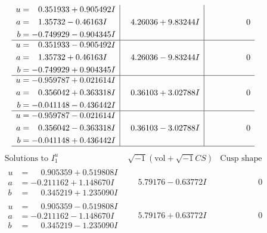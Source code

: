 \documentclass[1p]{elsarticle_modified}
\theoremstyle{definition}
\newcommand{\I}{\sqrt{-1}}
\begin{document}
$$\begin{array}{c|c|c}
\begin{aligned}
u &= \phantom{-}0.351933 + 0.905492 I \\
a &= \phantom{-}1.35732 - 0.46163 I \\
b &= -0.749929 - 0.904345 I\end{aligned}
 & \phantom{-}4.26036 + 9.83244 I & \phantom{-0.000000 } 0 \\ \hline\begin{aligned}
u &= \phantom{-}0.351933 - 0.905492 I \\
a &= \phantom{-}1.35732 + 0.46163 I \\
b &= -0.749929 + 0.904345 I\end{aligned}
 & \phantom{-}4.26036 - 9.83244 I & \phantom{-0.000000 } 0 \\ \hline\begin{aligned}
u &= -0.959787 + 0.021614 I \\
a &= \phantom{-}0.356042 + 0.363318 I \\
b &= -0.041148 - 0.436442 I\end{aligned}
 & \phantom{-}0.36103 + 3.02788 I & \phantom{-0.000000 } 0 \\ \hline\begin{aligned}
u &= -0.959787 - 0.021614 I \\
a &= \phantom{-}0.356042 - 0.363318 I \\
b &= -0.041148 + 0.436442 I\end{aligned}
 & \phantom{-}0.36103 - 3.02788 I & \phantom{-0.000000 } 0\\
 \hline 
 \end{array}$$\newpage$$\begin{array}{c|c|c}  
\text{Solutions to }I^u_{1}& \I (\text{vol} + \sqrt{-1}CS) & \text{Cusp shape}\\
 \hline 
\begin{aligned}
u &= \phantom{-}0.905359 + 0.519808 I \\
a &= -0.211162 + 1.148670 I \\
b &= \phantom{-}0.345219 + 1.235090 I\end{aligned}
 & \phantom{-}5.79176 - 0.63772 I & \phantom{-0.000000 } 0 \\ \hline\begin{aligned}
u &= \phantom{-}0.905359 - 0.519808 I \\
a &= -0.211162 - 1.148670 I \\
b &= \phantom{-}0.345219 - 1.235090 I\end{aligned}
 & \phantom{-}5.79176 + 0.63772 I & \phantom{-0.000000 } 0 \\ \hline\begin{aligned}

\end{aligned}
\end{array}$$
\end{document}
